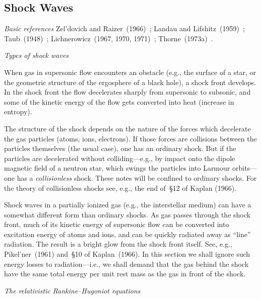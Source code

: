 \subsection{Shock Waves}
\label{sec:2.7}

\emph{Basic references}\quad
Zel'dovich and Raizer~(1966)~\cite{ZeldovichRaizer1966};
Landau and Lifshitz~(1959)~\cite{LandauLifshitz1959};
Taub~(1948)~\cite{Taub1948};
Lichnerowicz~(1967, 1970, 1971)~\cite{Lichnerowicz1967};
Thorne~(1973a)~\cite{Thorne1973a}.

\bigskip
\noindent
\emph{Types of shock waves}

\medskip
\noindent
When gas in supersonic flow encounters an obstacle (e.g., the surface of a star,
or the geometric structure of the ergosphere of a black hole), a shock front
develops.  In the shock front the flow decelerates sharply from supersonic to
subsonic, and some of the kinetic energy of the flow gets converted into heat
(increase in entropy).

The structure of the shock depends on the nature of the forces which decelerate
the gas particles (atoms, ions, electrons).  If those forces are collisions between
the particles themselves (the usual case), one has an ordinary shock.  But if the
particles are decelerated without colliding---e.g., by impact onto the dipole
magnetic field of a neutron star, which swings the particles into Larmour
orbits---one has a \emph{collisionless} shock.  These notes will be confined to ordinary
shocks.  For the theory of collisionless shocks see, e.g., the end of~\S12 of Kaplan
(1966).

Shock waves in a partially ionized gas (e.g., the interstellar medium) can have
a somewhat different form than ordinary shocks.  As gas passes through the shock
front, much of its kinetic energy of supersonic flow can be converted into
excitation energy of atoms and ions, and can be quickly radiated away as ``line''
radiation.  The result is a bright glow from the shock front itself.  See, e.g.,
Pikel'ner~(1961) and~\S10 of Kaplan~(1966).  In this section we shall ignore such
energy losses to radiation---i.e., we shall demand that the gas behind the shock
have the same total energy per unit rest mass as the gas in front of the shock.


\bigskip
\noindent
\emph{The relativistic Rankine--Hugoniot equations}

